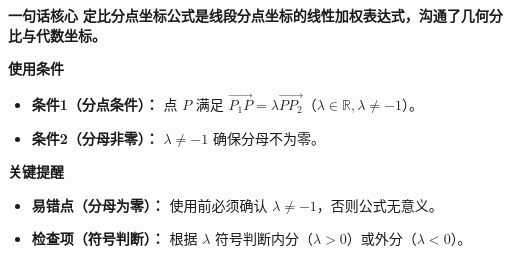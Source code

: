 \begin{summarybox}
	\textbf{\textcolor{CSummary}{一句话核心}}
	\textbf{定比分点坐标公式是线段分点坐标的线性加权表达式，沟通了几何分比与代数坐标。}

	\medskip
	\textbf{\textcolor{CSummary}{使用条件}}
	\begin{itemize}[leftmargin=*, itemsep=0.5em, topsep=0.4em]
		\item \textbf{条件1（分点条件）：} 点 $P$ 满足 $\overrightarrow{P_1P}=\lambda\overrightarrow{PP_2}$（$\lambda\in\mathbb{R},\lambda\neq -1$）。
		\item \textbf{条件2（分母非零）：} $\lambda\neq -1$ 确保分母不为零。
	\end{itemize}

	\medskip
	\textbf{\textcolor{CSummary}{关键提醒}}
	\begin{itemize}[leftmargin=*, itemsep=0.5em, topsep=0.4em]
		\item \textbf{易错点（分母为零）：} 使用前必须确认 $\lambda\neq -1$，否则公式无意义。
		\item \textbf{检查项（符号判断）：} 根据 $\lambda$ 符号判断内分（$\lambda>0$）或外分（$\lambda<0$）。
	\end{itemize}

\end{summarybox}
